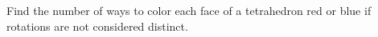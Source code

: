 Find the number of ways to color each face of a tetrahedron red or blue if rotations are not considered distinct.
